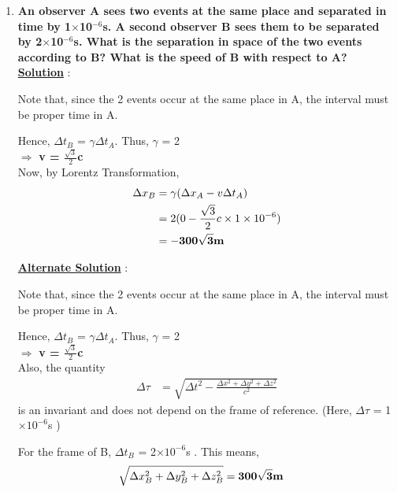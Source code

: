 \documentclass[10pt, a4paper]{article}
\begin{document}
\begin{enumerate}
\item {\bf An observer A sees two events at the same place and separated in time by 1$\times$10$^{-6}$s. A second observer B sees them to be separated by 2$\times$10$^{-6}$s. What is the separation in space of the two events according to B? What is the speed of B with respect to A? } \\

{\underline {\bf Solution}} :

Note that, since the 2 events occur at the same place in A, the interval must be proper time in A.

Hence, $\Delta t_{B}$ = $\gamma \Delta t_{A}$.
Thus, $\gamma$ = 2\\
$\Rightarrow$ {\bf v = $\frac{\sqrt{3}}{2}$c}\\

Now, by Lorentz Transformation,
\begin{align*}
	\Delta x_{B} &= \gamma (\Delta x_{A} - v\Delta t_{A}) \\
	&= 2 (0 - \frac{\sqrt{3}}{2}c\times 1\times 10^{-6} ) \\
	&= {\bf -300\sqrt{3}  m}
\end{align*}


{\underline {\bf Alternate Solution}} :

Note that, since the 2 events occur at the same place in A, the interval must be proper time in A.

Hence, $\Delta t_{B}$ = $\gamma \Delta t_{A}$.
Thus, $\gamma$ = 2\\
$\Rightarrow$ {\bf v = $\frac{\sqrt{3}}{2}$c}\\

Also, the quantity
\begin{align*}
	\Delta \tau &= \sqrt{\Delta t^{2} - \frac{\Delta x^{2} + \Delta y^{2} + \Delta z^{2}}{c^{2}}}
\end{align*}
is an invariant and does not depend on the frame of reference. (Here, $\Delta \tau$ = 1$\times 10^{-6}$s )

For the frame of B, $\Delta t_{B}$ = 2$\times10^{-6}$s .
This means,
\begin{align*}
	\sqrt{\Delta x^{2}_{B} + \Delta y^{2}_{B} + \Delta z^{2}_{B}} &= {\bf 300\sqrt{3}  m}
\end{align*}

\end{enumerate}
\end{document}
